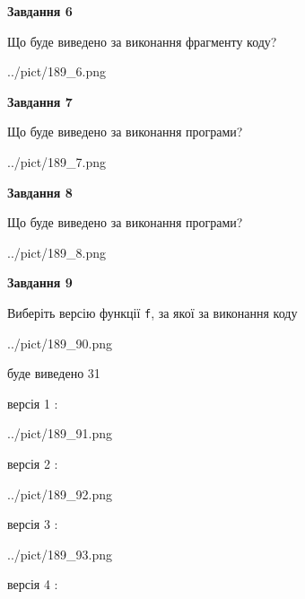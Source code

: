 \documentclass[12pt, ukrainian]{article}
\def\code#1{\Verb!#1!}
\begin{document}
{\begin {large}
{\begin {center}\textbf{Завдання 6}\end {center}}

Що буде виведено за виконання фрагменту коду?\par
\begin{center}
	{../pict/189_6.png}
\end{center}
\newpage

{\begin {center}\textbf{Завдання 7}\end {center}}

Що буде виведено за виконання програми?\par
\begin{center}
	{../pict/189_7.png}
\end{center}
\newpage

{\begin {center}\textbf{Завдання 8}\end {center}}

Що буде виведено за виконання програми?\par
\begin{center}
	{../pict/189_8.png}
\end{center}
\newpage

{\begin {center}\textbf{Завдання 9}\end {center}}

Виберіть версію функції \code{f}, за якої за виконання коду
\begin{center}
	{../pict/189_90.png}
\end{center}
буде виведено 31

\vspace{5mm}
версія 1 :

\begin{center}
	{../pict/189_91.png}
\end{center}
версія 2 :

\begin{center}
	{../pict/189_92.png}
\end{center}
версія 3 :

\begin{center}
	{../pict/189_93.png}
\end{center}
версія 4 :


\end{large}}
\end{document}
